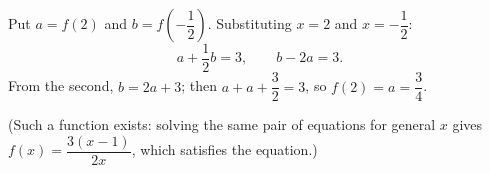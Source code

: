 Put $a=f(2)$ and $b=f\left(-\dfrac12\right)$. Substituting $x=2$ and $x=-\dfrac12$:
\[a+\dfrac12b=3,\qquad b-2a=3.\]
From the second, $b=2a+3$; then $a+a+\dfrac32=3$, so $f(2)=a=\boxed{\dfrac34}$.

(Such a function exists: solving the same pair of equations for general $x$ gives $f(x)=\dfrac{3(x-1)}{2x}$, which satisfies the equation.)
